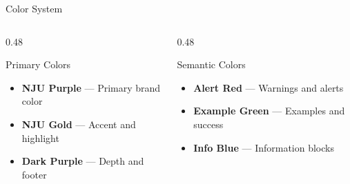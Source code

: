 \documentclass{ctexbeamer}
\begin{document}
\begin{frame}{Color System}
    \begin{columns}[c, onlytextwidth]
        \begin{column}{0.48\textwidth}
            \begin{block}{Primary Colors}
                \begin{itemize}
                    \item \textcolor{NJUPurple}{\textbf{NJU Purple}} --- Primary brand color
                    \item \textcolor{NJUGold}{\textbf{NJU Gold}} --- Accent and highlight
                    \item \textcolor{NJUPurpleDark}{\textbf{Dark Purple}} --- Depth and footer
                \end{itemize}
            \end{block}
        \end{column}
        \begin{column}{0.48\textwidth}
            \begin{exampleblock}{Semantic Colors}
                \begin{itemize}
                    \item \textcolor{NJUAlert}{\textbf{Alert Red}} --- Warnings and alerts
                    \item \textcolor{NJUExample}{\textbf{Example Green}} --- Examples and success
                    \item \textcolor{NJUInfo}{\textbf{Info Blue}} --- Information blocks
                \end{itemize}
            \end{exampleblock}
        \end{column}
    \end{columns}
\end{frame}
\end{document}
